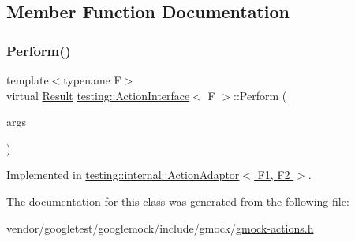 \subsection{Member Function Documentation}
\mbox{\label{classtesting_1_1_action_interface_a20f8624fcea1786f2992b358760422a0}} 
\subsubsection{\texorpdfstring{Perform()}{Perform()}}
{\footnotesize\ttfamily template$<$typename F$>$ \\
virtual \hyperlink{classtesting_1_1_action_interface_a7477de2fe3e4e01c59db698203acaee7}{Result} \hyperlink{classtesting_1_1_action_interface}{testing\+::\+Action\+Interface}$<$ F $>$\+::Perform (\begin{DoxyParamCaption}\item[{const \hyperlink{classtesting_1_1_action_interface_af72720d864da4d606629e83edc003511}{Argument\+Tuple} \&}]{args }\end{DoxyParamCaption})\hspace{0.3cm}{\ttfamily [pure virtual]}}



Implemented in \hyperlink{classtesting_1_1internal_1_1_action_adaptor_a8d8a47a31f068cf6e0c95b91605d5540}{testing\+::internal\+::\+Action\+Adaptor$<$ F1, F2 $>$}.



The documentation for this class was generated from the following file\+:\begin{DoxyCompactItemize}
\item 
vendor/googletest/googlemock/include/gmock/\hyperlink{gmock-actions_8h}{gmock-\/actions.\+h}\end{DoxyCompactItemize}
